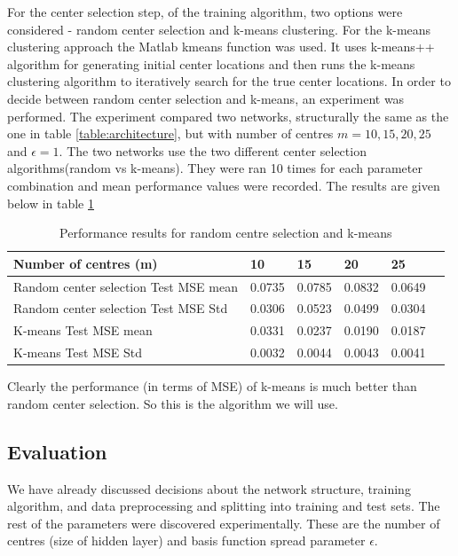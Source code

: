 \documentclass[a4paper, 11pt]{article}
\begin{document}
For the center selection step, of the training algorithm, two options were considered - random center selection and k-means clustering. For the k-means clustering approach the Matlab kmeans function was used. It uses k-means++ algorithm \cite{Arthur2007} for generating initial center locations and then runs the k-means clustering algorithm \cite{Lloyd82} to iteratively search for the true center locations. In order to decide between random center selection and k-means, an experiment was performed.  The experiment compared two networks, structurally the same as the one in table \ref{table:architecture}, but with number of centres $m = 10, 15, 20, 25$ and $\epsilon = 1$. The two networks use the two different center selection algorithms(random vs k-means). They were ran 10 times for each parameter combination and mean performance values were recorded. The results are given below in table \ref{table:centermse}

\begin{table}[h]
\centering
\begin{tabular}{| l | l | l | l | l | l |}
\hline
Number of centres (m) & 10 & 15 & 20 & 25 \\
\hline
Random center selection Test MSE mean & 0.0735 & 0.0785 & 0.0832 & 0.0649 \\
\hline
Random center selection Test MSE Std & 0.0306 & 0.0523 & 0.0499 & 0.0304 \\
\hline
K-means Test MSE mean & 0.0331 & 0.0237 & 0.0190 & 0.0187 \\
\hline
K-means Test MSE Std & 0.0032 & 0.0044 & 0.0043 & 0.0041 \\
\hline
\end{tabular}
\caption{Performance results for random centre selection and k-means}
\label{table:centermse}
\end{table}


Clearly the performance (in terms of MSE) of k-means is much better than random center selection. So this is the algorithm we will use.

\subsection{Evaluation}
We have already discussed decisions about the network structure, training algorithm, and data preprocessing and splitting into training and test sets. The rest of the parameters were discovered experimentally. These are the number of centres (size of hidden layer) and basis function spread parameter $\epsilon$.
\end{document}
